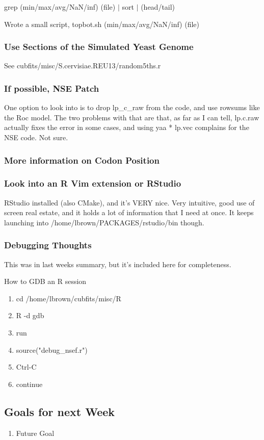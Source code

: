 grep (min/max/avg/NaN/inf) (file) $\vert$ sort $\vert$ (head/tail)

Wrote a small script, topbot.sh (min/max/avg/NaN/inf) (file)

\subsubsection{Use Sections of the Simulated Yeast Genome}

See cubfits/misc/S.cervisiae.REU13/random5ths.r


\subsubsection{If possible, NSE Patch}

One option to look into is to drop lp\_c\_raw from the code, and use rowsums like the Roc model. The two problems with that are that, as far as I can tell, lp.c.raw actually fixes the error in some cases, and using yaa * lp.vec complains for the NSE code. Not sure.

\subsubsection{More information on Codon Position}

\subsubsection{Look into an R Vim extension or RStudio}

RStudio installed (also CMake), and it's VERY nice. Very intuitive, good use of screen real estate, and it holds a lot of information that I need at once. It keeps launching into /home/lbrown/PACKAGES/rstudio/bin though.

\subsubsection{Debugging Thoughts}

This was in last weeks summary, but it's included here for completeness.

How to GDB an R session
\begin{enumerate}
\item cd /home/lbrown/cubfits/misc/R
\item R -d gdb
\item run
\item source("debug\_nsef.r")
\item Ctrl-C
\item continue
\end{enumerate}





\subsection{Goals for next Week}
\begin{enumerate}
\item Future Goal
\end{enumerate}


